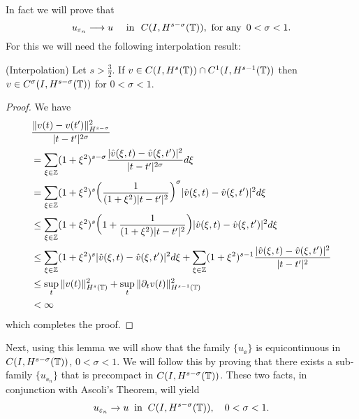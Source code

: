 In fact we will prove that 
%
\begin{equation}
\label{strong-conv}
u_{\varepsilon_n}\longrightarrow u
\quad
 \ \text{in} \ \,\,   C(I, H^{s-\sigma}(\mathbb{T})),\ \text{for any} \
\, 0 < \sigma <
1.
\end{equation}
%
For this we will need the following interpolation  result:
%
%
%
%
\begin{lemma}
\label{interpolation-lem}
(Interpolation)     Let  $s > \frac{3}{2}$.
If $v \in C(I, H^s(\mathbb{T})) \cap C^1(I, H^{s-1}(\mathbb{T}))$
then $v \in C^\sigma (I, H^{s- \sigma}(\mathbb{T}))$ for  $0 < \sigma < 1$.
\end{lemma}
%
\begin{proof} We have
\begin{equation*}
\begin{split}
& \frac{\|v(t) - v(t')\|^2_{H^{s - \sigma}}}{|t - t'|^{2\sigma}}
\\
& = 
\sum_{\xi \in \mathbb{Z}} (1 + \xi^2)^{s- \sigma} 
\frac{|\hat{v}(\xi, t) - \hat{v}(\xi, t')|^2}{|t-t'|^{2\sigma}} d\xi\\
& = \sum_{\xi \in \mathbb{Z}} (1+\xi^2)^s 
\bigg(\frac{1}{(1+ \xi^2)|t - t'|^2} \bigg)^\sigma |\hat{v}(\xi, t)- \hat{v}(\xi, t')|^2 d\xi\\
& \leq \sum_{\xi \in \mathbb{Z}}(1+\xi^2)^s \bigg( 1 + \frac{1}{(1+\xi^2)|t-t'|^2} \bigg)
|\hat{v}(\xi,t) - \hat{v}(\xi,t')|^2 d\xi \\
& \leq \sum_{\xi \in \mathbb{Z}} (1+ \xi^2)^s |\hat{v}(\xi, t)- \hat{v}(\xi, t')|^2 d\xi
+ \sum_{\xi \in \mathbb{Z}} (1+ \xi^2)^{s-1} \frac{|\hat{v}(\xi, t) - \hat{v} (\xi, t')|^2}{|t-t'|^2} \\
& \leq  \sup_t \|v(t)\|_{H^s(\mathbb{T})}^2 + \sup_t
\| \partial_t v(t) \|_{H^{s-1}(\mathbb{T})}^2
\\
& < \infty
\end{split}
\end{equation*}
%
which completes the proof.
\end{proof}
%
Next, using this lemma we will show that the family $\{u_\ee\}$ is
equicontinuous in $C(I, H^{s-\sigma}(\mathbb{T}))$, $0 < \sigma < 1$. We
will follow this by proving that there exists a sub-family
$\{u_{\ee_n} \}$ that is precompact in $C(I,
H^{s-\sigma}(\mathbb{T}))$. These two facts, in conjunction with Ascoli's
Theorem, will yield
\begin{equation}
\label{strong-conv2}
u_{\varepsilon_n} \to u \; \; \text{in} \; \; C(I,H^{s-\sigma}(\mathbb{T})),
\quad
0 < \sigma < 1.
\end{equation}
%
%
%
%
%

